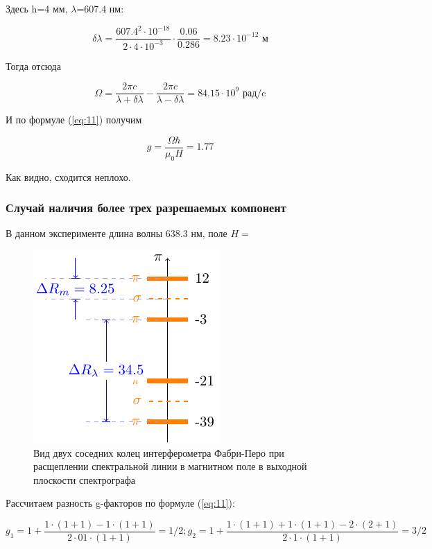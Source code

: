 Здесь h=4 мм,  $\lambda$=607.4 нм:

\begin{equation}
 	\delta \lambda=\frac{607.4^2\cdot10^{-18}}{2\cdot4\cdot10^{-3}}\cdot\frac{0.06}{0.286}=8.23\cdot10^{-12} \text{ м}
 \end{equation} 

Тогда отсюда

\begin{equation}
	\Omega=\frac{2\pi c}{\lambda+\delta \lambda}-\frac{2\pi c}{\lambda-\delta \lambda}=84.15\cdot10^{9} \text{ рад/c}
\end{equation}

И по формуле (\ref{eq:11}) получим

\begin{equation}
	g=\frac{\Omega \hbar}{\mu_0 H}=1.77
\end{equation}

Как видно, сходится неплохо.

\subsubsection{Случай наличия более трех разрешаемых компонент}

В данном эксперименте длина волны 638.3 нм, поле $H=$
\begin{figure}[h!]
	\centering
	\includegraphics[scale=1]{ris/4b}
	\caption{Вид двух соседних колец интерферометра Фабри-Перо при расщеплении спектральной линии в магнитном поле в выходной плоскости спектрографа}
	\label{fig:ris4b}
\end{figure}

Рассчитаем разность g-факторов по формуле (\ref{eq:11}):

\begin{equation}
g_{1}=1+\frac{1\cdot(1+1)-1\cdot(1+1)}{2\cdot01\cdot(1+1)}=1/2; g_{2}=1+\frac{1\cdot(1+1)+1\cdot(1+1)-2\cdot(2+1)}{2\cdot1\cdot(1+1)}=3/2
\end{equation}


